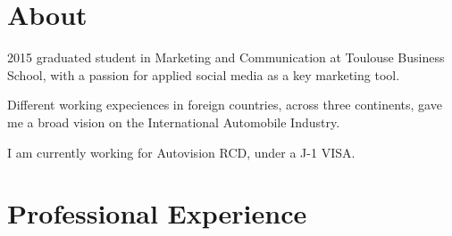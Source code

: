 \documentclass[]{cv}
\begin{document}


\footer{\today}





\section{About}

2015 graduated student in Marketing and Communication at Toulouse Business
School, with a passion for applied social media as a key marketing tool.

Different working expeciences in foreign countries, across three
continents, gave me a broad vision on the International Automobile
Industry.

I am currently working for Autovision RCD, under a J-1 VISA.

\framebreak

\section{Professional Experience}
\end{document}

